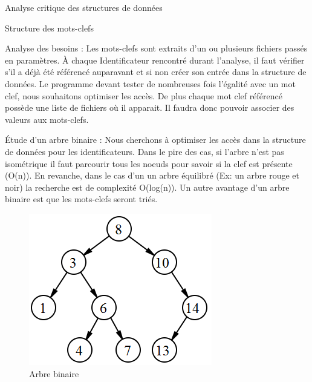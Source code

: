 \documentclass{article}
\begin{document}
\begin{section}{Analyse critique des structures de données}


  \begin{subsection}{Structure des mots-clefs}
    \begin {paragraph}{Analyse des besoins :}
    Les mots-clefs sont extraits d'un ou plusieurs fichiers passés en paramètres. À chaque Identificateur rencontré durant l'analyse,
    il faut vérifier s'il a déjà été référencé auparavant et si non créer son entrée dans la structure de données. Le programme devant
    tester de nombreuses fois l'égalité avec un mot clef, nous souhaitons optimiser les accès. De plus chaque mot clef référencé 
    possède une liste de fichiers où il apparait. Il faudra donc pouvoir associer des valeurs aux mots-clefs.
    \end{paragraph}
    
    \begin{paragraph}{Étude d'un arbre binaire :}
     Nous cherchons à optimiser les accès dans la structure de données pour les identificateurs. Dans le pire des cas, si l'arbre
     n'est pas isométrique il faut parcourir tous les noeuds pour savoir si la clef est présente (O(n)). En revanche, dans le cas d'un 
     un arbre équilibré (Ex: un arbre rouge et noir) la recherche est de complexité O(log(n)).
     Un autre avantage d'un arbre binaire est que les mots-clefs seront triés.
     
    \begin{figure}[htp]
    \centering
    \includegraphics[scale=0.5]{images/arbre.png}
    \caption{Arbre binaire}
    \end{figure}


\end{paragraph}
\end{subsection}
\end{section}
\end{document}
